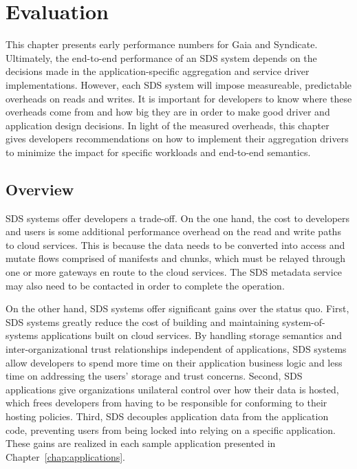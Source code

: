 \chapter{Evaluation}
\label{chap:evaluation}

This chapter presents early performance numbers for Gaia and Syndicate.
Ultimately, the end-to-end performance of an SDS system depends on the decisions
made in the application-specific aggregation and service driver implementations.
 However, each SDS system will impose measureable, predictable overheads on
reads and writes.  It is important for developers to know where these overheads
come from and how big they are in order to make good driver and application design decisions.
In light of the measured overheads, this chapter gives developers
recommendations on how to implement their aggregation drivers to minimize the
impact for specific workloads and end-to-end semantics.

\section{Overview}

SDS systems offer developers a trade-off.  On the one hand, the cost to
developers and users is some additional performance overhead on the read and write paths to cloud services.
This is because the data needs to be converted
into access and mutate flows comprised of manifests and chunks, which must be
relayed through one or more gateways en route to the cloud services.
The SDS metadata service may also need to be contacted in order to
complete the operation.

On the other hand, SDS systems offer significant gains over the status quo.
First, SDS systems greatly reduce the cost of building and maintaining
system-of-systems applications built on cloud services.  By handling storage
semantics and inter-organizational trust relationships
independent of applications, SDS systems allow developers to spend more time on
their application business logic and less time on addressing the users'
storage and trust concerns.  Second, SDS applications
give organizations unilateral control over how
their data is hosted, which frees developers from having to be
responsible for conforming to their hosting policies.
Third, SDS decouples application data from the application
code, preventing users from being locked into relying on a specific
application.  These gains are realized in each
sample application presented in Chapter~\ref{chap:applications}.

